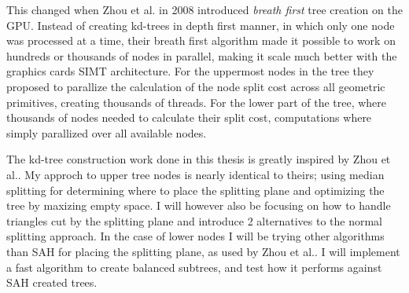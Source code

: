 This changed when Zhou et al. in 2008 introduced
\textit{breath first} tree creation on the GPU. Instead of creating
kd-trees in depth first manner, in which only one node was processed
at a time, their breath first algorithm made it possible to work on
hundreds or thousands of nodes in parallel, making it scale much
better with the graphics cards SIMT architecture. For the uppermost
nodes in the tree they proposed to parallize the calculation of the
node split cost across all geometric primitives, creating thousands of
threads. For the lower part of the tree, where thousands of nodes
needed to calculate their split cost, computations where simply
parallized over all available nodes.



The kd-tree construction work done in this thesis is greatly inspired
by Zhou et al.. My approch to upper tree nodes is
nearly identical to theirs; using median splitting for determining
where to place the splitting plane and optimizing the tree by maxizing
empty space. I will however also be focusing on how to handle
triangles cut by the splitting plane and introduce 2 alternatives to
the normal splitting approach. In the case of lower nodes I will be
trying other algorithms than SAH for placing the splitting plane, as
used by Zhou et al.. I will implement a fast
algorithm to create balanced subtrees, and test how it performs
against SAH created trees.
